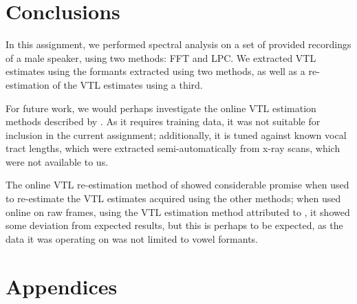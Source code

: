 \documentclass[11pt]{article}
\begin{document}
\section{Conclusions}
\label{sect:conclude}

In this assignment, we performed spectral analysis on a set of provided recordings of a male speaker, using two methods: FFT and LPC. We extracted VTL estimates using the formants extracted using two methods, as well as a re-estimation of the VTL estimates using a third.

For future work, we would perhaps investigate the online VTL estimation methods described by \citet{lammert2015short}. As it requires training data, it was not suitable for inclusion in the current assignment; additionally, it is tuned against known vocal tract lengths, which were extracted semi-automatically from x-ray scans, which were not available to us.

The online VTL re-estimation method of \citet{rodriguez2010line} showed considerable promise when used to re-estimate the VTL estimates acquired using the other methods; when used online on raw frames, using the VTL estimation method attributed to \citet{necioglu2000unsupervised}, it showed some deviation from expected results, but this is perhaps to be expected, as the data it was operating on was not limited to vowel formants.

\newpage



\newpage
\section{Appendices}
\end{document}
